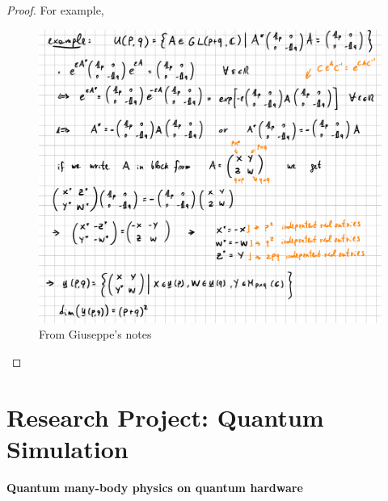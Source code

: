 \documentclass{book}
\theoremstyle{definition}
\begin{document}
\begin{proof}
	For example,
	\begin{figure}[!htb]
		\centering
		\includegraphics[scale=0.4]{lie}
		\caption{From Giuseppe's notes}
	\end{figure}
\end{proof}
































\newpage



\chapter{Research Project: Quantum Simulation}

\textbf{Quantum many-body physics on quantum hardware}\\
\end{document}
